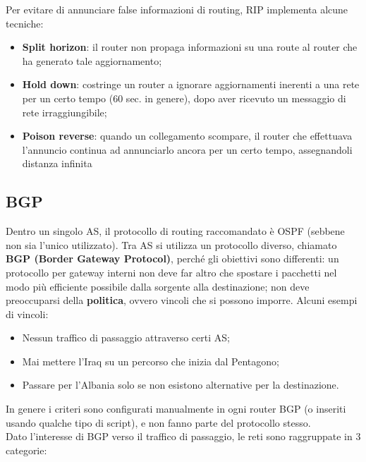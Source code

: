         Per evitare di annunciare false informazioni di routing, RIP implementa alcune tecniche:

            \begin{itemize}
                \item \textbf{Split horizon}: il router non propaga informazioni su una route al router che ha generato
                tale aggiornamento;
                \item \textbf{Hold down}: costringe un router a ignorare aggiornamenti inerenti a una rete per un
                certo tempo (60 sec. in genere), dopo aver ricevuto un messaggio di rete irraggiungibile;
                \item \textbf{Poison reverse}: quando un collegamento scompare, il router che effettuava l’annuncio
                continua ad annunciarlo ancora per un certo tempo, assegnandoli distanza infinita
            \end{itemize}

        \subsection{BGP}
        Dentro un singolo AS, il protocollo di routing raccomandato è OSPF (sebbene non sia l’unico
        utilizzato). Tra AS si utilizza un protocollo diverso, chiamato \textbf{BGP (Border Gateway Protocol)},
        perché gli obiettivi sono differenti: un protocollo per gateway interni non deve far altro che
        spostare i pacchetti nel modo più efficiente possibile dalla sorgente alla destinazione; non deve
        preoccuparsi della \textbf{politica}, ovvero vincoli che si possono imporre. Alcuni esempi di vincoli:
        
            \begin{itemize}
                \item Nessun traffico di passaggio attraverso certi AS;
                \item Mai mettere l’Iraq su un percorso che inizia dal Pentagono;
                \item Passare per l’Albania solo se non esistono alternative per la destinazione.
            \end{itemize}

        In genere i criteri sono configurati manualmente in ogni router BGP (o inseriti usando qualche
        tipo di script), e non fanno parte del protocollo stesso.\\

        Dato l’interesse di BGP verso il traffico di passaggio, le reti sono raggruppate in 3 categorie:

